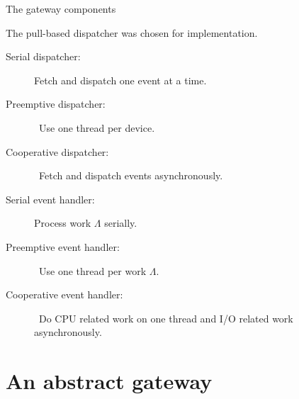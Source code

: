 \documentclass{beamer}
\begin{document}
    \begin{frame}{The gateway components}

        The pull-based dispatcher was chosen for implementation.

        \begin{description}
            \item[Serial dispatcher:] Fetch and dispatch one event at a time.
            \item[Preemptive dispatcher:] Use one thread per device.
            \item[Cooperative dispatcher:] Fetch and dispatch events asynchronously.
            \item[Serial event handler:] Process work $\Lambda$ serially.
            \item[Preemptive event handler:] Use one thread per work $\Lambda$.
            \item[Cooperative event handler:] Do CPU related work on one thread and I/O
                related work asynchronously.
        \end{description}

    \end{frame}

    \section{An abstract gateway}
\end{document}
